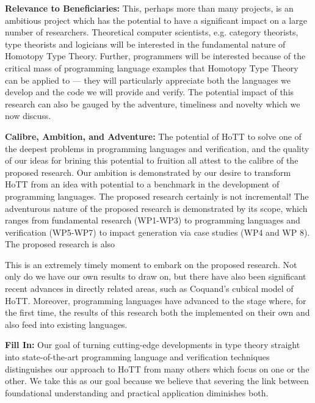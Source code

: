 \documentclass[a4paper,11pt]{article}
\begin{document}
\vspace*{-0.1in}


{\bf Relevance to Beneficiaries:} This, perhaps more than many
projects, is an ambitious project which has the potential to have
a significant impact on a large number of researchers. Theoretical
computer scientists, e.g. category theorists, type theorists and
logicians will be interested in the fundamental nature of Homotopy
Type Theory. Further, programmers will be interested because of the
critical mass of programming language examples that Homotopy Type
Theory can be applied to --- they will particularly appreciate both
the languages we develop and the code we will provide and verify. The
potential impact of this research can also be gauged by the adventure,
timeliness and novelty which we now discuss.

{\bf Calibre, Ambition, and Adventure:} The potential of HoTT to solve
one of the deepest problems in programming languages and verification,
and the quality of our ideas for brining this potential to fruition
all attest to the calibre of the proposed research. Our ambition is
demonstrated by our desire to transform HoTT
from an idea with potential to a benchmark in the development of
programming languages. The proposed
research certainly is not incremental! The adventurous nature of the
proposed research is demonstrated by its scope, which ranges from
fundamental research (WP1-WP3) to programming languages and verification
(WP5-WP7) to impact generation via case studies (WP4 and WP 8). The
proposed research is also

 This is an extremely timely moment to
embark on the proposed research. Not only do we have our own results
to draw on, but there have also been significant recent advances in
directly related areas, such as Coquand's cubical model of HoTT.
Moreover, programming
languages have advanced to the stage where, for the first time, the
results of this research both the implemented on their own and also
feed into existing languages.

 {\bf  Fill In:}
Our goal of
turning cutting-edge developments in type theory straight into state-of-the-art
programming language and  verification 
techniques distinguishes our approach to HoTT from many others which
focus on one or the other. We take this as our goal because
we believe that severing the link between foundational understanding
and practical application diminishes both.
 
\vspace*{0.02in}
\end{document}
